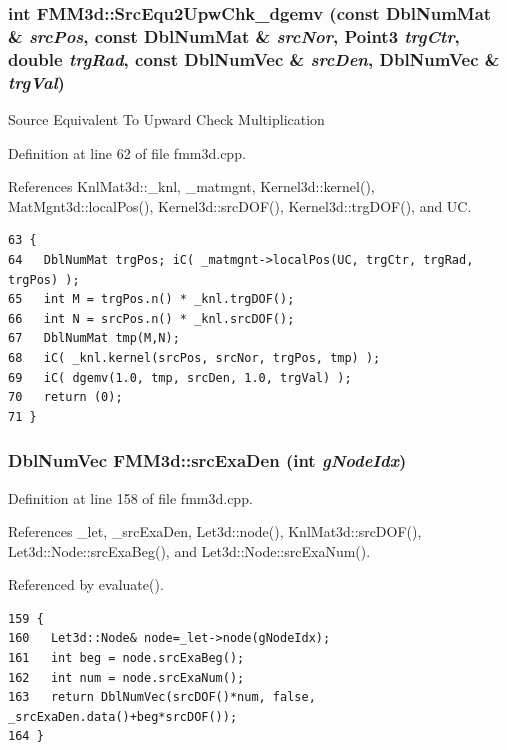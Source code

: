 \subsubsection{\setlength{\rightskip}{0pt plus 5cm}int FMM3d::Src\-Equ2Upw\-Chk\_\-dgemv (const Dbl\-Num\-Mat \& {\em src\-Pos}, const Dbl\-Num\-Mat \& {\em src\-Nor}, Point3 {\em trg\-Ctr}, double {\em trg\-Rad}, const Dbl\-Num\-Vec \& {\em src\-Den}, Dbl\-Num\-Vec \& {\em trg\-Val})\hspace{0.3cm}{\tt  [protected]}}\label{classFMM3d_27c277175f2fcddbed5486dc7d2ef24b_27c277175f2fcddbed5486dc7d2ef24b}


Source Equivalent To Upward Check Multiplication 

Definition at line 62 of file fmm3d.cpp.

References Knl\-Mat3d::\_\-knl, \_\-matmgnt, Kernel3d::kernel(), Mat\-Mgnt3d::local\-Pos(), Kernel3d::src\-DOF(), Kernel3d::trg\-DOF(), and UC.

\footnotesize\begin{verbatim}63 {
64   DblNumMat trgPos; iC( _matmgnt->localPos(UC, trgCtr, trgRad, trgPos) );
65   int M = trgPos.n() * _knl.trgDOF();
66   int N = srcPos.n() * _knl.srcDOF();
67   DblNumMat tmp(M,N);
68   iC( _knl.kernel(srcPos, srcNor, trgPos, tmp) );
69   iC( dgemv(1.0, tmp, srcDen, 1.0, trgVal) );
70   return (0);
71 }
\end{verbatim}\normalsize 


\subsubsection{\setlength{\rightskip}{0pt plus 5cm}Dbl\-Num\-Vec FMM3d::src\-Exa\-Den (int {\em g\-Node\-Idx})\hspace{0.3cm}{\tt  [protected]}}\label{classFMM3d_85c92673b5d5f9d5344d040bb29f31d8_85c92673b5d5f9d5344d040bb29f31d8}




Definition at line 158 of file fmm3d.cpp.

References \_\-let, \_\-src\-Exa\-Den, Let3d::node(), Knl\-Mat3d::src\-DOF(), Let3d::Node::src\-Exa\-Beg(), and Let3d::Node::src\-Exa\-Num().

Referenced by evaluate().

\footnotesize\begin{verbatim}159 {
160   Let3d::Node& node=_let->node(gNodeIdx);
161   int beg = node.srcExaBeg();
162   int num = node.srcExaNum();
163   return DblNumVec(srcDOF()*num, false, _srcExaDen.data()+beg*srcDOF());
164 }
\end{verbatim}\normalsize 


